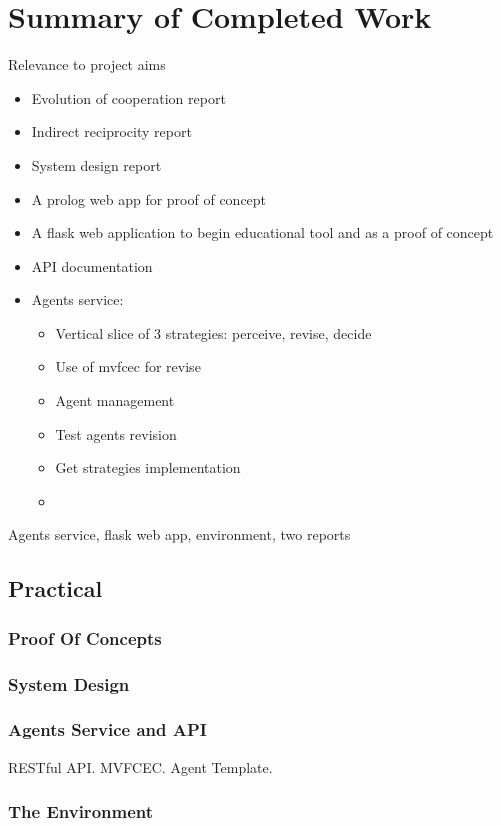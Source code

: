 \documentclass[]{final_report}
\begin{document}
\chapter{Summary of Completed Work}
Relevance to project aims
\begin{itemize}
	\item Evolution of cooperation report
	\item Indirect reciprocity report
	\item System design report
	\item A prolog web app for proof of concept
	\item A flask web application to begin educational tool and as a proof of concept
	\item API documentation
	\item Agents service:
	\begin{itemize}
		\item Vertical slice of 3 strategies: perceive, revise, decide
		\item Use of mvfcec for revise
		\item Agent management
		\item Test agents revision
		\item Get strategies implementation
		\item 
	\end{itemize}
\end{itemize}
Agents service, flask web app, environment, two reports

\section{Practical}

\subsection{Proof Of Concepts}

\subsection{System Design}

\subsection{Agents Service and API}
RESTful API. MVFCEC. Agent Template.

\subsection{The Environment}
\end{document}
